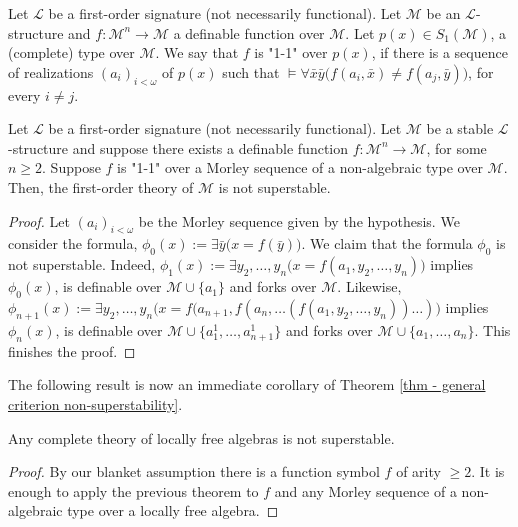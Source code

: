 \documentclass[a4paper,11pt]{article}
\begin{document}
\begin{definition}
Let $\mathcal{L}$ be a first-order signature (not necessarily functional). Let $\mathcal{M}$ be an $\mathcal{L}$-structure and $f:\mathcal{M}^n\rightarrow \mathcal{M}$ a definable function over $\mathcal{M}$. Let $p(x)\in S_1(\mathcal{M})$, a (complete) type over $\mathcal{M}$. We say that $f$ is "1-1" over $p(x)$, if there is a sequence of realizations $(a_i)_{i<\omega}$ of $p(x)$ such that $\models \forall \bar x\bar y\big(f(a_i,\bar x)\neq f(a_j,\bar y)\big)$, for every $i\neq j$.   
\end{definition}

\begin{theorem}\label{thm - general criterion non-superstability}
Let $\mathcal{L}$ be a first-order signature (not necessarily functional). Let $\mathcal{M}$ be a stable $\mathcal{L}$-structure and suppose there exists a definable function $f:\mathcal{M}^n\rightarrow \mathcal{M}$, for some $n\geq 2$. Suppose $f$ is "1-1" over a Morley sequence of a non-algebraic type over $\mathcal{M}$. Then, the first-order theory of $\mathcal{M}$ is not superstable. 
\end{theorem}
\begin{proof}
Let $(a_i)_{i<\omega}$ be the Morley sequence given by the hypothesis. We consider the formula, $\phi_0(x):=\exists \bar y\big(x=f(\bar y)\big)$. We claim that the formula $\phi_0$ is not superstable. Indeed, $\phi_1(x):= \exists y_2, \ldots, y_n \big(x=f(a_1, y_2, \ldots, y_n)\big)$ implies $\phi_0(x)$, is definable over $\mathcal{M}\cup\{a_1\}$ and forks over $\mathcal{M}$. Likewise, $\phi_{n+1}(x):=\exists y_2, \ldots, y_n\big(x=f(a_{n+1},f(a_{n},\ldots(f(a_1,y_2, \ldots, y_n))\ldots)\big)$ implies $\phi_n(x)$, is definable over $\mathcal{M}\cup\{a_1^1, \ldots, a_{n+1}^1\}$ and forks over $\mathcal{M}\cup \{a_1, \ldots, a_n\}$. This finishes the proof. 
 \end{proof}

The following result is now an immediate corollary of Theorem \ref{thm - general criterion non-superstability}. 

\begin{corollary}
Any complete theory of locally free algebras is not superstable.
\end{corollary}
\begin{proof}
By our blanket assumption there is a function symbol $f$ of arity $\geq 2$. It is enough to apply the previous theorem to $f$ and any Morley sequence of a non-algebraic type over a locally free algebra. 
\end{proof}
\end{document}
